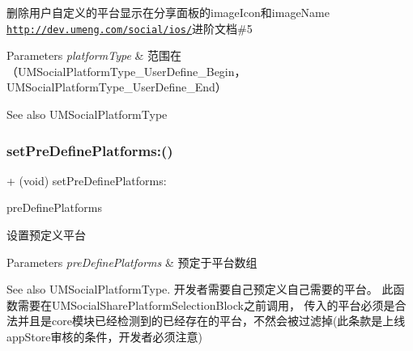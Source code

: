 删除用户自定义的平台显示在分享面板的image\+Icon和image\+Name \href{http://dev.umeng.com/social/ios/}{\tt http\+://dev.\+umeng.\+com/social/ios/}进阶文档\#5


\begin{DoxyParams}{Parameters}
{\em platform\+Type} & 范围在（\+U\+M\+Social\+Platform\+Type\+\_\+\+User\+Define\+\_\+\+Begin，\+U\+M\+Social\+Platform\+Type\+\_\+\+User\+Define\+\_\+\+End） \\
\hline
\end{DoxyParams}
\begin{DoxySeeAlso}{See also}
U\+M\+Social\+Platform\+Type 
\end{DoxySeeAlso}
\mbox{\label{interface_u_m_social_u_i_manager_ae5565446fb0163b860b188ca76af8c5f}} 
\subsubsection{\texorpdfstring{set\+Pre\+Define\+Platforms\+:()}{setPreDefinePlatforms:()}\hspace{0.1cm}{\footnotesize\ttfamily [1/2]}}
{\footnotesize\ttfamily + (void) set\+Pre\+Define\+Platforms\+: \begin{DoxyParamCaption}\item[{(N\+S\+Array $\ast$)}]{pre\+Define\+Platforms }\end{DoxyParamCaption}}

设置预定义平台


\begin{DoxyParams}{Parameters}
{\em pre\+Define\+Platforms} & 预定于平台数组\\
\hline
\end{DoxyParams}
\begin{DoxySeeAlso}{See also}
U\+M\+Social\+Platform\+Type. 开发者需要自己预定义自己需要的平台。 此函数需要在\+U\+M\+Social\+Share\+Platform\+Selection\+Block之前调用， 传入的平台必须是合法并且是core模块已经检测到的已经存在的平台，不然会被过滤掉(此条款是上线app\+Store审核的条件，开发者必须注意) 
\end{DoxySeeAlso}
\mbox{\label{interface_u_m_social_u_i_manager_ae5565446fb0163b860b188ca76af8c5f}} 
